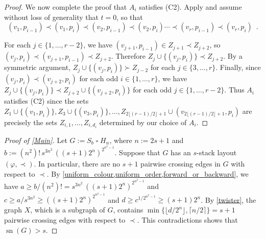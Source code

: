 \documentclass[kpfonts]{patmorin}
\DeclareMathOperator{\sn}{sn}
\renewcommand{\ge}{\geqslant}
\renewcommand{\geq}{\geqslant}
\newcommand{\CartProd}{\mathbin{\square}}
\begin{document}
\begin{proof}

We now complete the proof that $A_i$ satisfies (C2). Apply  and assume without loss of generality that $t=0$, so that
	\[
		(v_1,p_{i-1})\prec (v_1,p_{i}) \prec (v_2,p_{i-1}) \prec (v_2,p_{i}) \cdots \prec (v_r,p_{i-1}) \prec (v_r,p_{i}) \enspace .
	\]

    For each $j\in\{1,\ldots,r-2\}$, we have $(v_{j+1},p_{i-1})\in Z_{j+1}\prec Z_{j+2}$, so  $(v_j,p_i)\prec (v_{j+1},p_{i-1}) \prec Z_{j+2}$.  Therefore $Z_j\cup\{(v_j,p_i)\} \prec Z_{j+2}$.  By a symmetric argument, $Z_j\cup\{(v_j,p_i)\} \succ Z_{j-2}$ for each  $j\in\{3,\ldots,r\}$.  Finally, since $(v_{j},p_i)\prec (v_{j+2},p_i)$ for each odd $i\in\{1,\ldots,r\}$, we have $Z_{j}\cup\{(v_j,p_i)\} \prec Z_{j+2}\cup\{(v_{j+2},p_i)\}$ for each odd $j\in\{1,\ldots,r-2\}$.  Thus $A_i$ satisfies (C2) since the sets $Z_1\cup\{(v_1,p_i)\},Z_3\cup\{(v_3,p_i)\},\ldots,Z_{2\lfloor (r-1)/2\rfloor+1} \cup (v_{2\lfloor (r-1)/2\rfloor+1},p_i)$ are precisely the sets $Z_{i,1},\ldots,Z_{i,d_i}$ determined by our choice of $A_i$.
\end{proof}

%
%

\begin{proof}[Proof of \cref{Main}]
Let $G := S_b \CartProd H_n$, where $n :=2s+1$ and $b := (n^2)!\, s^{3n^2}\, ((s+1)2^n)^{2^{n^2-1}} $. Suppose that $G$ has an $s$-stack layout  $(\varphi,\prec)$. In particular, there are no $s+1$ pairwise crossing edges in $G$ with respect to $\prec$. By \cref{uniform_colour,uniform_order,forward_or_backward}, we have $a\ge b/(n^2)! = s^{3n^2}\, ((s+1)2^n)^{2^{n^2-1}}$ and $c\ge a/s^{3n^2} \geq ((s+1)2^n)^{2^{n^2-1}}$ and
$d\ge c^{1/2^{n^2-1}} \ge (s+1)2^n$. By \cref{twister}, the graph $X$, which is a subgraph of $G$, contains $\min\{\lfloor d/2^{n}\rfloor,\lceil n/2\rceil\}=s+1$ pairwise crossing edges with respect to $\prec$. This contradictions shows that $\sn(G)> s$.
\end{proof}
\end{document}
